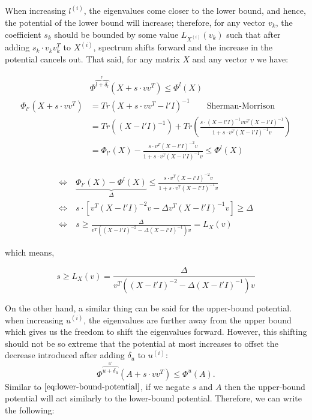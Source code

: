\documentclass[
  letterpaper,
  DIV=11,
  numbers=noendperiod]{scrartcl}
\theoremstyle{plain}
\theoremstyle{plain}
\theoremstyle{plain}
\theoremstyle{definition}
\theoremstyle{plain}
\theoremstyle{remark}
\begin{document}
When increasing \(l^{(i)}\), the eigenvalues come closer to the lower
bound, and hence, the potential of the lower bound will increase;
therefore, for any vector \(v_k\), the coefficient \(s_k\) should be
bounded by some value \(L_{X^{(i)}}(v_k)\) such that after adding
\(s_k \cdot v_k v_k^T\) to \(X^{(i)}\), spectrum shifts forward and the
increase in the potential cancels out. That said, for any matrix \(X\)
and any vector \(v\) we have:

\begin{align*}
&\Phi^{\overset{l'}{\overbrace{l + \delta_l}}}(X + s \cdot vv^T) \le \Phi^l(X)\\
\Phi_{l'}(X + s \cdot vv^T) & = Tr(X + s \cdot vv^T - l'I)^{-1}  \qquad \text{Sherman-Morrison}\\
& = Tr\left((X - l'I)^{-1}\right) + Tr\left(\frac{s \cdot (X - l'I)^{-1} v v^T (X - l'I)^{-1}}{1 + s \cdot v^T (X - l' I)^{-1} v}\right)\\
&= \Phi_{l'}(X) - \frac{s \cdot v^T (X - l'I)^{-2}v}{1 + s \cdot v^T  (X - l'I)^{-1}v} \le \Phi^l(X)
\end{align*}

\begin{align*}
\Leftrightarrow &~ \underset{\Delta}{\underbrace{\Phi_{l'}(X) - \Phi^l(X)}} \le \frac{s \cdot v^T (X - l'I)^{-2}v}{1 + s \cdot v^T  (X - l'I)^{-1}v}\\
\Leftrightarrow &~ s\cdot \left[v^T (X - l'I)^{-2}v  - \Delta v^T(X - l' I)^{-1} v\right] \ge \Delta \\ 
\Leftrightarrow &~ s \ge \frac{\Delta}{v^T \left( (X - l'I)^{-2} - \Delta (X - l' I)^{-1} \right) v} = L_X(v)
\end{align*}

which means,

\begin{equation} \tag{1}\label{eq:lower-bound-potential}
s \ge L_X(v) = \frac{\Delta}{v^T \left((X - l' I)^{-2} - \Delta (X - l' I)^{-1} \right) v}
\end{equation}

On the other hand, a similar thing can be said for the upper-bound
potential. when increasing \(u^{(i)}\), the eigenvalues are further away
from the upper bound which gives us the freedom to shift the eigenvalues
forward. However, this shifting should not be so extreme that the
potential at most increases to offset the decrease introduced after
adding \(\delta_u\) to \(u^{(i)}\): \[ 
\Phi^{\overset{u'}{\overbrace{u + \delta_u}}}(A + s \cdot vv^T) \le \Phi^u(A).
\] Similar to \(\eqref{eq:lower-bound-potential}\), if we negate \(s\)
and \(A\) then the upper-bound potential will act similarly to the
lower-bound potential. Therefore, we can write the following:
\end{document}
